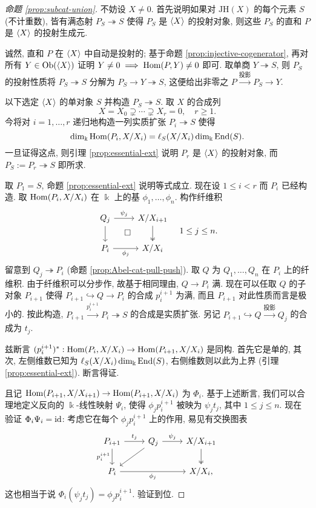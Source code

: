 \begin{proof}[命题 \ref{prop:subcat-union}]
	不妨设 $X \neq 0$. 首先说明如果对 $\mathrm{JH}(X)$ 的每个元素 $S$ (不计重数), 皆有满态射 $P_S \twoheadrightarrow S$ 使得 $P_S$ 是 $\left\langle X \right\rangle$ 的投射对象, 则这些 $P_S$ 的直和 $P$ 是 $\left\langle X \right\rangle$ 的投射生成元.
	
	诚然, 直和 $P$ 在 $\left\langle X \right\rangle$ 中自动是投射的; 基于命题 \ref{prop:injective-cogenerator}, 再对所有 $Y \in \operatorname{Ob}(\left\langle X \right\rangle)$ 证明 $Y \neq 0 \implies \operatorname{Hom}(P, Y) \neq 0$ 即可. 取单商 $Y \twoheadrightarrow S$, 则 $P_S$ 的投射性质将 $P_S \twoheadrightarrow S$ 分解为 $P_S \to Y \twoheadrightarrow S$, 这便给出非零之 $P \xrightarrow{\text{投影}} P_S \to Y$.
	
	以下选定 $\left\langle X \right\rangle$ 的单对象 $S$ 并构造 $P_S \twoheadrightarrow S$. 取 $X$ 的合成列
	\[ X = X_0 \supsetneq \cdots \supsetneq X_r = 0, \quad r \geq 1. \]
	今将对 $i = 1, \ldots, r$ 递归地构造一列实质扩张 $P_i \twoheadrightarrow S$ 使得
	\[ \dim_{\Bbbk} \operatorname{Hom}(P_i, X/X_i) = \ell_S(X/X_i) \dim_{\Bbbk} \operatorname{End}(S). \]
	一旦证得这点, 则引理 \ref{prop:essential-ext} 说明 $P_r$ 是 $\left\langle X \right\rangle$ 的投射对象, 而 $P_S := P_r \twoheadrightarrow S$ 即所求.

	取 $P_1 = S$, 命题 \ref{prop:essential-ext} 说明等式成立. 现在设 $1 \leq i < r$ 而 $P_i$ 已经构造. 取 $\operatorname{Hom}(P_i, X/X_i)$ 在 $\Bbbk$ 上的基 $\phi_1, \ldots, \phi_n$. 构作纤维积
	\[\begin{tikzcd}
		Q_j \arrow[d] \arrow[r, "{\psi_j}"] & X/X_{i+1} \arrow[twoheadrightarrow, d] \\
		P_i \arrow[r, "{\phi_j}"'] & X/X_i \arrow[phantom, lu, "\Box" description]
	\end{tikzcd} \quad 1 \leq j \leq n.\]
	留意到 $Q_j \twoheadrightarrow P_i$ (命题 \ref{prop:Abel-cat-pull-push}). 取 $Q$ 为 $Q_1, \ldots, Q_n$ 在 $P_i$ 上的纤维积. 由于纤维积可以分步作, 故基于相同理由, $Q \to P_i$ 满. 现在可以任取 $Q$ 的子对象 $P_{i+1}$ 使得 $P_{i+1} \hookrightarrow Q \to P_i$ 的合成 $p^{i+1}_i$ 为满, 而且 $P_{i+1}$ 对此性质而言是极小的. 按此构造, $P_{i+1} \xrightarrow{p^{i+1}_i} P_i \twoheadrightarrow S$ 的合成是实质扩张. 另记 $P_{i+1} \hookrightarrow Q \xrightarrow{\text{投影}} Q_j$ 的合成为 $t_j$.
	
	兹断言 $(p^{i+1}_i)^*: \operatorname{Hom}(P_i, X/X_i) \to \operatorname{Hom}(P_{i+1}, X/X_i)$ 是同构. 首先它是单的, 其次, 左侧维数已知为 $\ell_S(X/X_i) \dim_{\Bbbk} \operatorname{End}(S)$, 右侧维数则以此为上界 (引理 \ref{prop:essential-ext}). 断言得证.
	
	且记 $\operatorname{Hom}(P_{i+1}, X/X_{i+1}) \to \operatorname{Hom}(P_{i+1}, X/X_i)$ 为 $\Phi_i$. 基于上述断言, 我们可以合理地定义反向的 $\Bbbk$-线性映射 $\Psi_i$, 使得 $\phi_j p^{i+1}_i$ 被映为 $\psi_j t_j$, 其中 $1 \leq j \leq n$. 现在验证 $\Phi_i \Psi_i = \mathrm{id}$: 考虑它在每个 $\phi_j p^{i+1}_i$ 上的作用, 易见有交换图表
	\[\begin{tikzcd}
		P_{i+1} \arrow[r, "{t_j}"] \arrow[d, "{p^{i+1}_i}"'] & Q_j \arrow[r, "{\psi_j}"] \arrow[ld] & X/X_{i+1} \arrow[twoheadrightarrow, d] \\
		P_i \arrow[rr, "{\phi_j}"'] & & X/X_i ,
	\end{tikzcd}\]
	这也相当于说 $\Phi_i(\psi_j t_j) = \phi_j p^{i+1}_i$. 验证到位.
	

\end{proof}
